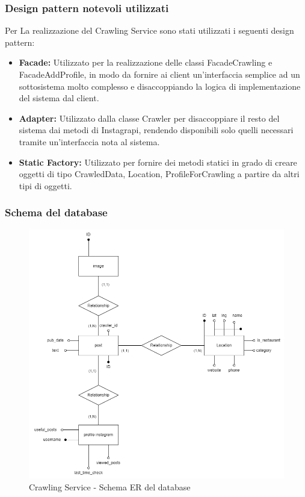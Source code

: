 \subsubsection{Design pattern notevoli utilizzati}
Per La realizzazione del Crawling Service sono stati utilizzati i seguenti design pattern:
\begin{itemize}
    \item \textbf{Facade:} Utilizzato per la realizzazione delle classi FacadeCrawling e FacadeAddProfile, in modo da fornire ai client un'interfaccia semplice ad un sottosistema molto complesso e disaccoppiando la logica di implementazione del sistema dal client.
    \item \textbf{Adapter:} Utilizzato dalla classe Crawler per disaccoppiare il resto del sistema dai metodi di Instagrapi, rendendo disponibili solo quelli necessari tramite un'interfaccia nota al sistema.
    \item \textbf{Static Factory:} Utilizzato per fornire dei metodi statici in grado di creare oggetti di tipo CrawledData, Location, ProfileForCrawling a partire da altri tipi di oggetti.
\end{itemize}

\subsubsection{Schema del database}
\begin{figure}[h]
    \centering
    \includegraphics[scale=0.35]{Contenuto/Immagini/ER-CS.png}
    \caption{Crawling Service - Schema ER del database}
\end{figure}